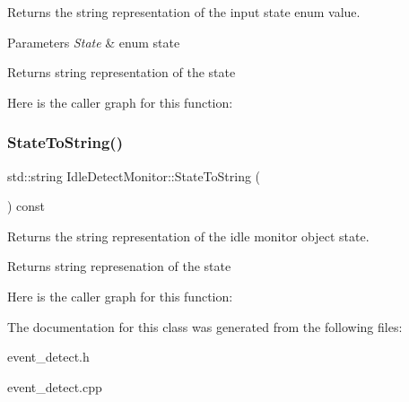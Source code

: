 Returns the string representation of the input state enum value. 


\begin{DoxyParams}{Parameters}
{\em State} & enum state \\
\hline
\end{DoxyParams}
\begin{DoxyReturn}{Returns}
string representation of the state 
\end{DoxyReturn}
Here is the caller graph for this function\+:
\mbox{\label{classEventDetect_1_1IdleDetectMonitor_a0bad0433a375a2fa4d0a0e8c088a9922}} 
\subsubsection{\texorpdfstring{State\+To\+String()}{StateToString()}\hspace{0.1cm}{\footnotesize\ttfamily [2/2]}}
{\footnotesize\ttfamily std\+::string Idle\+Detect\+Monitor\+::\+State\+To\+String (\begin{DoxyParamCaption}{ }\end{DoxyParamCaption}) const}



Returns the string representation of the idle monitor object state. 

\begin{DoxyReturn}{Returns}
string represenation of the state 
\end{DoxyReturn}
Here is the caller graph for this function\+:


The documentation for this class was generated from the following files\+:\begin{DoxyCompactItemize}
\item 
event\+\_\+detect.\+h\item 
event\+\_\+detect.\+cpp\end{DoxyCompactItemize}
